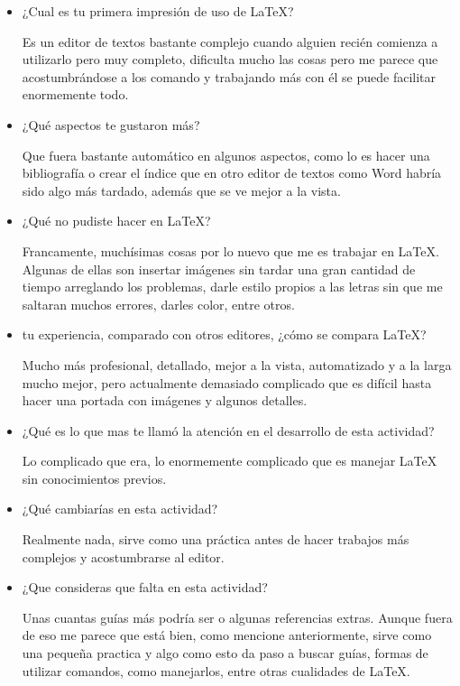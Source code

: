 \documentclass[a4paper,12pt]{report}
\begin{document}
\begin{itemize}

\item ¿Cual es tu primera impresión de uso de LaTeX?

Es un editor de textos bastante complejo cuando alguien recién comienza a utilizarlo pero muy completo, dificulta mucho las cosas pero me parece que acostumbrándose a los comando y trabajando más con él se puede facilitar enormemente todo.

\item ¿Qué aspectos te gustaron más?

Que fuera bastante automático en algunos aspectos, como lo es hacer una bibliografía o crear el índice que en otro editor de textos como Word habría sido algo más tardado, además que se ve mejor a la vista.

\item ¿Qué no pudiste hacer en LaTeX?

Francamente, muchísimas cosas por lo nuevo que me es trabajar en LaTeX. Algunas de ellas son insertar imágenes sin tardar una gran cantidad de tiempo arreglando los problemas, darle estilo propios a las letras sin que me saltaran muchos errores, darles color, entre otros.

\item tu experiencia, comparado con otros editores, ¿cómo se compara LaTeX? 

Mucho más profesional, detallado, mejor a la vista, automatizado y a la larga mucho mejor, pero actualmente demasiado complicado que es difícil hasta hacer una portada con imágenes y algunos detalles.

\item ¿Qué es lo que mas te llamó la atención en el desarrollo de esta actividad?

Lo complicado que era, lo enormemente complicado que es manejar LaTeX sin conocimientos previos.

\item ¿Qué cambiarías en esta actividad?

Realmente nada, sirve como una práctica antes de hacer trabajos más complejos y acostumbrarse al editor.

\item ¿Que consideras que falta en esta actividad? 

Unas cuantas guías más podría ser o algunas referencias extras. Aunque fuera de eso me parece que está bien, como mencione anteriormente, sirve como una pequeña practica y algo como esto da paso a buscar guías, formas de utilizar comandos, como manejarlos, entre otras cualidades de LaTeX.


\end{itemize}
\end{document}
